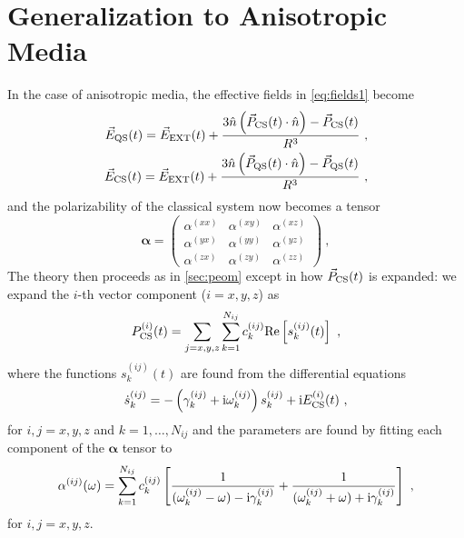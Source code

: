 \section{Generalization to Anisotropic Media}\label{app:anis}

In the case of anisotropic media, the effective fields in \cref{eq:fields1}
become
%
\begin{align}
    \vec E_\text{QS}(t) = \vec E_\text{EXT}(t) + \frac{3\hat n\left( \vec P_\text{CS}(t)\cdot\hat n
    \right)-\vec P_\text{CS}(t)}{ R^3} \ ,\\
    \vec E_\text{CS}(t) = \vec E_\text{EXT}(t) + \frac{3\hat n\left( \vec P_\text{QS}(t)\cdot\hat n
    \right)-\vec P_\text{QS}(t)}{ R^3} \ ,
\end{align}
%
%
and the polarizability of the classical
system now becomes a tensor
%
\begin{equation}
    \bm\alpha = 
    \begin{pmatrix}
        \alpha^{(xx)} & \alpha^{(xy)} & \alpha^{(xz)} \\
        \alpha^{(yx)} & \alpha^{(yy)} & \alpha^{(yz)} \\
        \alpha^{(zx)} & \alpha^{(zy)} & \alpha^{(zz)} 
    \end{pmatrix} \ ,
\end{equation}
%
The theory then proceeds as in \cref{sec:peom} except in how $\vec P_\text{CS}(t)$ is expanded: we expand
the $i$-th vector component ($i=x,y,z$) as 
%
\begin{equation}
    P_\text{CS}^{(i)}(t) = \sum_{j=x,y,z} \sum_{k=1}^{N_{ij}} c_k^{(ij)}
    \text{Re}\left[ s_k^{(ij)}(t) \right] \ ,
\end{equation}
%
where the functions $s_k^{(ij)}(t)$ are found from the differential equations
%
\begin{equation}
    \dot s_k^{(ij)} = -\left( \gamma_k^{(ij)} + \text{i}\omega_k^{(ij)}
    \right)s_k^{(ij)} + \text{i} E_\text{CS}^{(i)}(t) \ ,
\end{equation}
%
for $i,j=x,y,z$ and $k=1,\ldots,N_{ij}$ and the parameters are found by fitting
each component of the $\bm \alpha$ tensor to
%
\begin{equation}
    \alpha^{(ij)}(\omega) = \sum_{k=1}^{N_{ij}} c_k^{(ij)} \left[  \frac{1}{
        (\omega_k^{(ij)}-\omega)
     - \text{i}\gamma_k^{(ij)}} 
     + \frac{1}{ (\omega_{k}^{(ij)}+\omega)
 + \text{i}\gamma_k^{(ij)}} \right] \ ,
\end{equation}
%
for $i,j=x,y,z$.
